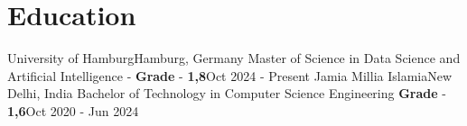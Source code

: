 \section{Education}
  \resumeSubHeadingListStart
    \resumeSubheading
      {University of Hamburg}{Hamburg, Germany}
      {Master of Science in Data Science and Artificial Intelligence - \textbf{Grade} - \textbf{1,8}}{Oct 2024 - Present}
  \resumeSubHeadingListEnd
  \vspace{-2pt}
  \resumeSubHeadingListStart
    \resumeSubheading
      {Jamia Millia Islamia}{New Delhi, India}
      {Bachelor of Technology in Computer Science Engineering \textbf{Grade} - \textbf{1,6}}{Oct 2020 - Jun 2024}
  \resumeSubHeadingListEnd
